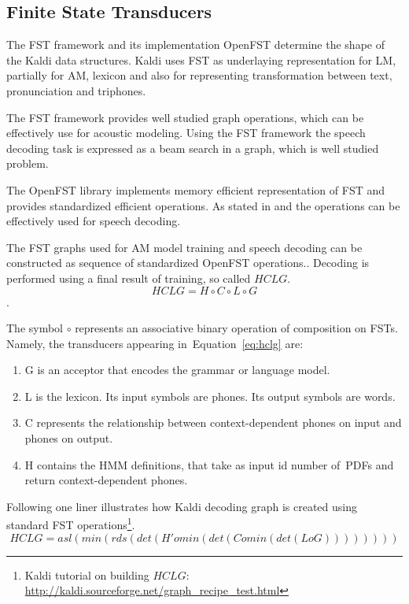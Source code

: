 {\subsection{Finite State Transducers} 
\label{sec:fst}
The \acl{FST} framework and its implementation OpenFST  
determine the shape of the Kaldi data structures.
Kaldi uses \ac{FST} as underlaying representation for \ac{LM}, partially for \ac{AM}, lexicon and 
also for representing transformation between text, pronunciation and triphones.

The \ac{FST} framework provides well studied graph operations\cite{mohri2002weighted},
which can be effectively use for acoustic modeling.
Using the \ac{FST} framework the speech decoding task is expressed as
a beam search in a graph, which is well studied problem.

The OpenFST library implements memory efficient representation of \ac{FST} and
provides standardized efficient operations.
As stated in \cite{mohri2002weighted} and \cite{povey2011kaldi} the operations can be effectively used
for speech decoding. 

The \ac{FST} graphs used for \ac{AM} model training and speech decoding
can be constructed as sequence of standardized OpenFST operations.\cite{mohri2002weighted}.
Decoding is performed using a final result of training, so called  $HCLG$. 
\begin{equation} \label{eq:hclg}
HCLG = H\circ C\circ L\circ G
\end{equation}.

The symbol $\circ$ represents an associative binary operation of composition on \acp{FST}.
Namely, the transducers appearing in~Equation~\ref{eq:hclg} are:
\begin{enumerate}
    \item G is an acceptor that encodes the grammar or language model.
    \item L is the lexicon. Its input symbols are phones. Its output symbols are words.
    \item C represents the relationship between context-dependent phones on input and phones on output.
    \item H contains the \ac{HMM} definitions, that take as input id number of~\acp{PDF} and return context-dependent phones.
\end{enumerate}

Following one liner illustrates how Kaldi decoding graph is created using standard \ac{FST} operations\footnote{Kaldi tutorial on building $HCLG$: \url{http://kaldi.sourceforge.net/graph_recipe_test.html}}.\cite{mohri2002weighted}
\begin{equation}
   HCLG = asl(min(rds(det(H' o min(det(C o min(det(L o G)))))))) 
\end{equation}

}
